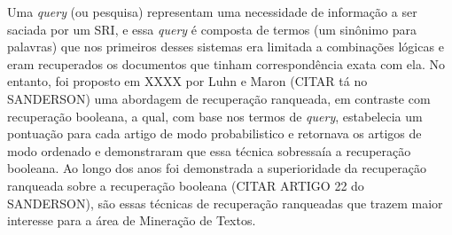 Uma \textit{query} (ou pesquisa) representam uma necessidade de informação a ser saciada por um SRI, e essa \textit{query} é composta de termos (um sinônimo para palavras) que nos primeiros desses sistemas era limitada a combinações lógicas e eram recuperados os documentos que tinham correspondência exata com ela. No entanto, foi proposto em XXXX por Luhn e Maron (CITAR tá no SANDERSON) uma abordagem de recuperação ranqueada, em contraste com recuperação booleana, a qual, com base nos termos de \textit{query}, estabelecia um pontuação para cada artigo de modo probabilistico e retornava os artigos de modo ordenado e demonstraram que essa técnica sobressaía a recuperação booleana. Ao longo dos anos foi demonstrada a superioridade da recuperação ranqueada sobre a recuperação booleana (CITAR ARTIGO 22 do SANDERSON), são essas técnicas de recuperação ranqueadas que trazem maior interesse para a área de Mineração de Textos.



